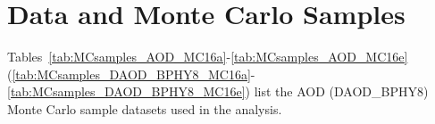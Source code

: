 \section{Data and Monte Carlo Samples}
\label{sec:App_DataMCSamples}

Tables~\ref{tab:MCsamples_AOD_MC16a}-\ref{tab:MCsamples_AOD_MC16e} (\ref{tab:MCsamples_DAOD_BPHY8_MC16a}-\ref{tab:MCsamples_DAOD_BPHY8_MC16e}) list the AOD (DAOD\_BPHY8) Monte Carlo sample datasets used in the analysis. 







